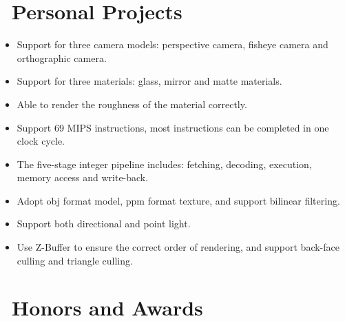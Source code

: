 \documentclass{resume}
\begin{document}
\section{\texorpdfstring{\faGithubAlt\ Personal Projects}{Personal Projects}}
\begin{itemize}
  \item Support for three camera models: perspective camera, fisheye camera and orthographic camera.
  \item Support for three materials: glass, mirror and matte materials.
  \item Able to render the roughness of the material correctly.
\end{itemize}

\begin{itemize}
  \item Support 69 MIPS instructions, most instructions can be completed in one clock cycle.
  \item The five-stage integer pipeline includes: fetching, decoding, execution, memory access and write-back. 
\end{itemize}

\begin{itemize}
  \item Adopt obj format model, ppm format texture, and support bilinear filtering.
  \item Support both directional and point light.
  \item Use Z-Buffer to ensure the correct order of rendering, and support back-face culling and triangle culling.
\end{itemize}

\section{\texorpdfstring{\faHeartO\ Honors and Awards}{Honors and Awards}}
\end{document}
